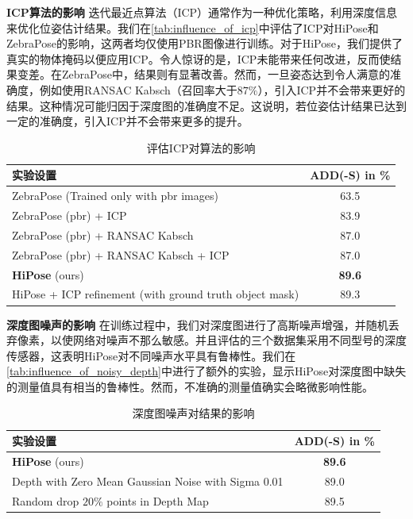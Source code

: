 \textbf{ICP算法的影响 }
迭代最近点算法（ICP）通常作为一种优化策略，利用深度信息来优化位姿估计结果。我们在\autoref{tab:influence_of_icp}中评估了ICP对HiPose和ZebraPose的影响，这两者均仅使用PBR图像进行训练。对于HiPose，我们提供了真实的物体掩码以便应用ICP。令人惊讶的是，ICP未能带来任何改进，反而使结果变差。在ZebraPose中，结果则有显著改善。然而，一旦姿态达到令人满意的准确度，例如使用RANSAC Kabsch（召回率大于$87\%$），引入ICP并不会带来更好的结果。这种情况可能归因于深度图的准确度不足。这说明，若位姿估计结果已达到一定的准确度，引入ICP并不会带来更多的提升。

\begin{table}[h]
    \centering
    \begin{tabular}{@{}l|c@{}}
      \toprule
      实验设置 & ADD(-S) in \% \\
      \midrule
      ZebraPose (Trained only with pbr images) & 63.5\\
      ZebraPose (pbr) + ICP & 83.9\\
      ZebraPose (pbr) + RANSAC Kabsch & 87.0\\
      ZebraPose (pbr) + RANSAC Kabsch + ICP & 87.0\\
      \midrule
      \textbf{HiPose} (ours) &  \textbf{89.6}\\
      HiPose + ICP refinement (with ground truth object mask) &  89.3\\
      \bottomrule
    \end{tabular}
    \caption{评估ICP对算法的影响}
    \label{tab:influence_of_icp}
  \end{table}

\textbf{深度图噪声的影响 }
在训练过程中，我们对深度图进行了高斯噪声增强，并随机丢弃像素，以使网络对噪声不那么敏感。并且评估的三个数据集采用不同型号的深度传感器，这表明HiPose对不同噪声水平具有鲁棒性。我们在\autoref{tab:influence_of_noisy_depth}中进行了额外的实验，显示HiPose对深度图中缺失的测量值具有相当的鲁棒性。然而，不准确的测量值确实会略微影响性能。

\begin{table}[h]
    \centering
        \begin{tabular}{@{}l|c@{}}
          \toprule
          实验设置 & ADD(-S) in \% \\
          \midrule
          \textbf{HiPose} (ours) &  \textbf{89.6}\\
          \midrule
          Depth with Zero Mean Gaussian Noise with Sigma 0.01 & 89.0\\
          Random drop $20\%$ points in Depth Map & 89.5 \\
          \bottomrule
        \end{tabular}
    \caption{深度图噪声对结果的影响}
    \label{tab:influence_of_noisy_depth}
\end{table}

